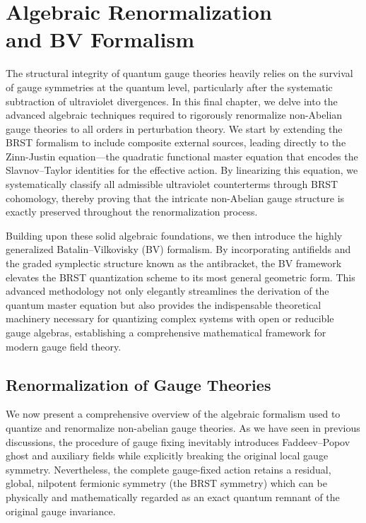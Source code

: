 \chapter[Algebraic Renormalization and BV Formalism]{Algebraic Renormalization\\and BV Formalism}

The structural integrity of quantum gauge theories heavily relies on the survival of gauge symmetries at the quantum level, particularly after the systematic subtraction of ultraviolet divergences. In this final chapter, we delve into the advanced algebraic techniques required to rigorously renormalize non-Abelian gauge theories to all orders in perturbation theory. We start by extending the BRST formalism to include composite external sources, leading directly to the Zinn-Justin equation—the quadratic functional master equation that encodes the Slavnov--Taylor identities for the effective action. By linearizing this equation, we systematically classify all admissible ultraviolet counterterms through BRST cohomology, thereby proving that the intricate non-Abelian gauge structure is exactly preserved throughout the renormalization process.

Building upon these solid algebraic foundations, we then introduce the highly generalized Batalin--Vilkovisky (BV) formalism. By incorporating antifields and the graded symplectic structure known as the antibracket, the BV framework elevates the BRST quantization scheme to its most general geometric form. This advanced methodology not only elegantly streamlines the derivation of the quantum master equation but also provides the indispensable theoretical machinery necessary for quantizing complex systems with open or reducible gauge algebras, establishing a comprehensive mathematical framework for modern gauge field theory.

\section{Renormalization of Gauge Theories}


We now present a comprehensive overview of the algebraic formalism used to quantize and renormalize non-abelian gauge theories. As we have seen in previous discussions, the procedure of gauge fixing inevitably introduces Faddeev--Popov ghost and auxiliary fields while explicitly breaking the original local gauge symmetry. Nevertheless, the complete gauge-fixed action retains a residual, global, nilpotent fermionic symmetry (the BRST symmetry) which can be physically and mathematically regarded as an exact quantum remnant of the original gauge invariance.

